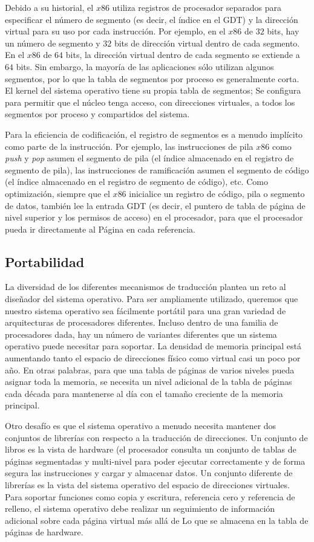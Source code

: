 \documentclass[10pt]{book}
\begin{document}
Debido a su historial, el $x86$ utiliza registros de procesador separados para especificar el número de segmento (es decir, el índice en el GDT) y la dirección virtual para su uso por cada instrucción. Por ejemplo, en el $x86$ de $32$ bits, hay un número de segmento y $32$ bits de dirección virtual dentro de cada segmento. En el $x86$ de $64$ bits, la dirección virtual dentro de cada segmento se extiende a $64$ bits. Sin embargo, la mayoría de las aplicaciones sólo utilizan algunos segmentos, por lo que la tabla de segmentos por proceso es generalmente corta. El kernel del sistema operativo tiene su propia tabla de segmentos; Se configura para permitir que el núcleo tenga acceso, con direcciones virtuales, a todos los segmentos por proceso y compartidos del sistema.

Para la eficiencia de codificación, el registro de segmentos es a menudo implícito como parte de la instrucción. Por ejemplo, las instrucciones de pila $x86$ como \textit{push} y \textit{pop} asumen el segmento de pila (el índice almacenado en el registro de segmento de pila), las instrucciones de ramificación asumen el segmento de código (el índice almacenado en el registro de segmento de código), etc. Como optimización, siempre que el $x86$ inicialice un registro de código, pila o segmento de datos, también lee la entrada GDT (es decir, el puntero de tabla de página de nivel superior y los permisos de acceso) en el procesador, para que el procesador pueda ir directamente al Página en cada referencia.

\subsection{Portabilidad}
La diversidad de los diferentes mecanismos de traducción plantea un reto al diseñador del sistema operativo. Para ser ampliamente utilizado, queremos que nuestro sistema operativo sea fácilmente portátil para una gran variedad de arquitecturas de procesadores diferentes. Incluso dentro de una familia de procesadores dada, hay un número de variantes diferentes que un sistema operativo puede necesitar para soportar. La densidad de memoria principal está aumentando tanto el espacio de direcciones físico como virtual casi un poco por año. En otras palabras, para que una tabla de páginas de varios niveles pueda asignar toda la memoria, se necesita un nivel adicional de la tabla de páginas cada década para mantenerse al día con el tamaño creciente de la memoria principal.

Otro desafío es que el sistema operativo a menudo necesita mantener dos conjuntos de librerías con respecto a la traducción de direcciones. Un conjunto de libros es la vista de hardware (el procesador consulta un conjunto de tablas de páginas segmentadas y multi-nivel para poder ejecutar correctamente y de forma segura las instrucciones y cargar y almacenar datos. Un conjunto diferente de librerías es la vista del sistema operativo del espacio de direcciones virtuales. Para soportar funciones como copia y escritura, referencia cero y referencia de relleno, el sistema operativo debe realizar un seguimiento de información adicional sobre cada página virtual más allá de Lo que se almacena en la tabla de páginas de hardware.
\end{document}

